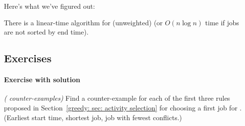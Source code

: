 
    


Here's what we've figured out:

\begin{theorem}
  There is a linear-time algorithm for (unweighted) 
  (or $O(n\log n)$ time if jobs are not sorted by end time).
\end{theorem}


\subsection{Exercises}

\paragraph{Exercise with solution}
\exercise\label{greedy: exercise: activity selection counter-examples}\emph{( counter-examples)}
Find a counter-example for each of the first three rules
proposed in Section~\ref{greedy: sec: activity selection}
for choosing a first job for .
(Earliest start time, shortest job, job with fewest conflicts.)

